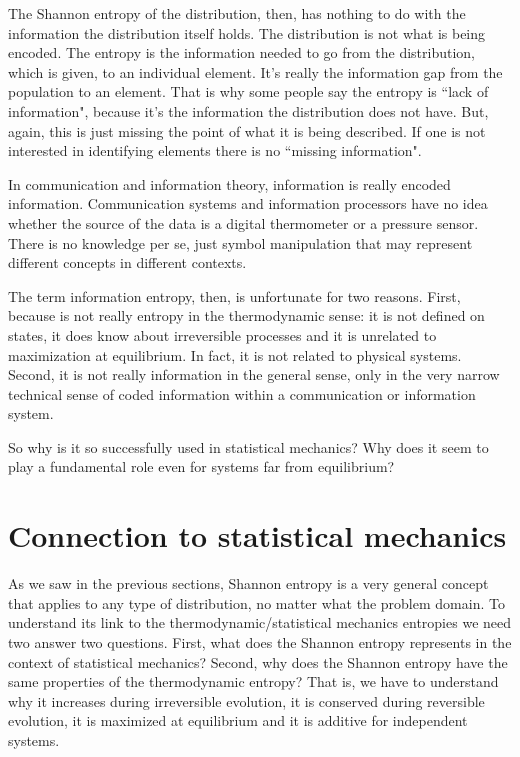 \documentclass{article}
\begin{document}
The Shannon entropy of the distribution, then, has nothing to do with the information the distribution itself holds. The distribution is not what is being encoded. The entropy is the information needed to go from the distribution, which is given, to an individual element. It's really the information gap from the population to an element. That is why some people say the entropy is ``lack of information", because it's the information the distribution does not have. But, again, this is just missing the point of what it is being described. If one is not interested in identifying elements there is no ``missing information".

In communication and information theory, information is really encoded information. Communication systems and information processors have no idea whether the source of the data is a digital thermometer or a pressure sensor. There is no knowledge per se, just symbol manipulation that may represent different concepts in different contexts.

The term information entropy, then, is unfortunate for two reasons. First, because is not really entropy in the thermodynamic sense: it is not defined on states, it does know about irreversible processes and it is unrelated to maximization at equilibrium. In fact, it is not related to physical systems. Second, it is not really information in the general sense, only in the very narrow technical sense of coded information within a communication or information system.

So why is it so successfully used in statistical mechanics? Why does it seem to play a fundamental role even for systems far from equilibrium?

\section{Connection to statistical mechanics}

As we saw in the previous sections, Shannon entropy is a very general concept that applies to any type of distribution, no matter what the problem domain. To understand its link to the thermodynamic/statistical mechanics entropies we need two answer two questions. First, what does the Shannon entropy represents in the context of statistical mechanics? Second, why does the Shannon entropy have the same properties of the thermodynamic entropy? That is, we have to understand why it increases during irreversible evolution, it is conserved during reversible evolution, it is maximized at equilibrium and it is additive for independent systems.
\end{document}
